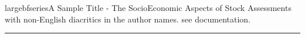 \documentclass[
  oneside,
  open=any]{scrbook}
\begin{document}
\begin{frontmatter}
\begin{titlepage}
{%
{largebfseries\nohyphens{A Sample Title - The SocioEconomic Aspects of
Stock Assessments}}\\[1\baselineskip]
{{with non-English diacritics in the author names. see
documentation.}}\\

\vspace{0.025\textheight} 

\rule{0.3\textwidth}{0.4pt} %
}

\newcommand{\titleandsubtitle}{
{%

{\large \bfseries \nohyphens{A Sample Title - The SocioEconomic Aspects
of Stock Assessments}}%
}%

\vspace{\betweentitlesubtitle}
{%

{\large \textit \nohyphens{with non-English diacritics in the author
names. see documentation.}}%
}%
}


\newcommand{\titlepagetitleblock}{
\titleandsubtitle
}



{%
\newcommand{\coverpagetitleblock}{\emptytitleblock}
}{}
{%
\newcommand{\coverpagetitleblock}{\plaintitleblock}
}{}
{%
\newcommand{\coverpagetitleblock}{\colorboxtitleblock}
}{}


\newcommand{\authorstyle}{%

\large %
}
\newcommand{\affiliationstyle}{%

%
}

\newcommand{\emptyauthorblock}{}

\newcommand{\plainauthorblock}{
{\authorstyle
%
{Jane Doe}%
, %
%
{Eva Nováková}%
, %
%
{Matti Meikäläinen}%
, %
%
{Ashok Kumar}%

}
}

\newcommand{\plainauthornewlineblock}{
{\authorstyle
%
{Jane Doe}%
\\%
%
{Eva Nováková}%
\\%
%
{Matti Meikäläinen}%
\\%
%
{Ashok Kumar}%

}
}


\end{titlepage}
\end{frontmatter}
\end{document}

